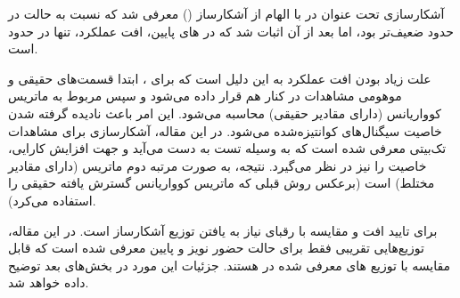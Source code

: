 آشکارسازی تحت عنوان  در  با الهام از آشکارساز   
()
 معرفی شد که نسبت به حالت 
\lr{$\infty$}
در حدود  ضعیف‌تر بود، اما بعد از آن اثبات شد که در های پایین، افت عملکرد، تنها در حدود  است.

علت زیاد بودن افت عملکرد به این دلیل است که برای ، ابتدا قسمت‌های حقیقی و موهومی مشاهدات در کنار هم قرار داده می‌شود و سپس  مربوط به ماتریس کوواریانس (دارای مقادیر حقیقی) محاسبه می‌شود. این امر باعث نادیده گرفته شدن خاصیت  سیگنال‌های کوانتیزه‌شده می‌شود.
در این مقاله، آشکارسازی برای مشاهدات تک‌بیتی معرفی شده است که به وسیله تست  به دست می‌آيد و جهت افزایش کارایی، خاصیت  را نیز در نظر می‌گیرد. نتیجه، به صورت  مرتبه دوم ماتریس  (دارای مقادیر مختلط) است (برعکس روش قبلی که ماتریس کوواریانس گسترش یافته حقیقی را استفاده می‌کرد).

برای تایید افت  و مقایسه با رقبای
نیاز به یافتن توزیع آشکارساز است. در این مقاله، توزیع‌هایی تقریبی فقط برای حالت حضور نویز و  پایین معرفی شده است که قابل مقایسه با توزیع های معرفی شده در  هستند. جزئیات این مورد در بخش‌های بعد توضیح داده خواهد شد.






